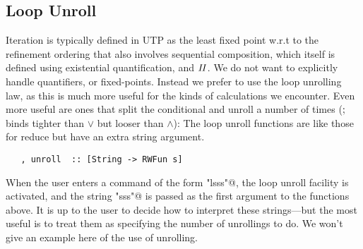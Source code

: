 \subsection{Loop Unroll}


Iteration is typically defined in UTP as the least fixed point
w.r.t to the refinement ordering
that also involves sequential composition,
which itself is defined using existential quantification,
and $\mathit{II}$.
We do not want to explicitly handle quantifiers,
or fixed-points.
Instead we prefer to use the loop unrolling law,
as this is much more useful for the kinds of calculations we encounter.
Even more useful are ones that split the conditional
and unroll a number of times ($\mathrel{;}$ binds tighter than $\lor$
but looser than $\land$):
The loop unroll functions are like those for reduce
but have an extra string argument.
\begin{verbatim}
   , unroll  :: [String -> RWFun s]
\end{verbatim}
When the user enters a command of the form \verb@"lsss"@,
the loop unroll facility is activated,
and the string \verb@"sss"@ is passed as the first argument to the functions
above. It is up to the user to decide how to interpret
these strings---but the most useful is to treat them as specifying
the number of unrollings to do.
We won't give an example here of the use of unrolling.
%
%
%
